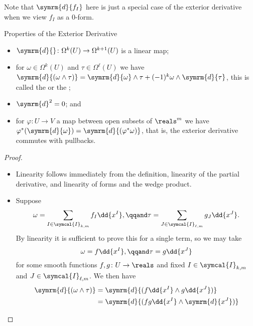 \documentclass[fleqn]{NotesClass}
\renewcommand{\dl}{\symrm{d}}
\begin{document}
    Note that \(\dl{f_I}\) here is just a special case of the exterior derivative when we view \(f_I\) as a 0-form.
    
    \begin{lma}{Properties of the Exterior Derivative}{}
        \begin{itemize}
            \item \(\dl{} \colon \Omega^k(U) \to \Omega^{k+1}(U)\) is a linear map;
            \item for \(\omega \in \Omega^k(U)\) and \(\tau \in \Omega^{\ell}(U)\) we have \(\dl{(\omega \wedge \tau)} = \dl{\omega} \wedge \tau + (-1)^{k} \omega \wedge \dl{\tau}\), this is called the  or the ;
            \item \(\dl^2 = 0\); and
            \item for \(\varphi \colon U \to V\) a map between open subsets of \(\reals^m\) we have \(\varphi^*(\dl{\omega}) = \dl{(\varphi^*\omega)}\), that is, the exterior derivative commutes with pullbacks.
        \end{itemize}
        \begin{proof}
            \begin{itemize}
                \item Linearity follows immediately from the definition, linearity of the partial derivative, and linearity of forms and the wedge product.
                \item Suppose
                \begin{equation}
                    \omega = \sum_{I \in \symcal{I}_{k,m}} f_I \dd{x^I}, \qqand \tau = \sum_{J \in \symcal{I}_{\ell, m}} g_J \dd{x^J}.
                \end{equation}
                By linearity it is sufficient to prove this for a single term, so we may take
                \begin{equation}
                    \omega = f \dd{x^I}, \qqand \tau = g \dd{x^J}
                \end{equation}
                for some smooth functions \(f, g \colon U \to \reals\) and fixed \(I \in \symcal{I}_{k,m}\) and \(J \in \symcal{I}_{\ell, m}\).
                We then have
                \begin{align}
                    \dl{(\omega \wedge \tau)} &= \dl{(f \dd{x^I} \wedge g \dd{x^J})}\\
                    &= \dl{(fg \dd{x^I} \wedge \dl{x^J})}\\

\end{align}
\end{itemize}
\end{proof}
\end{lma}
\end{document}
